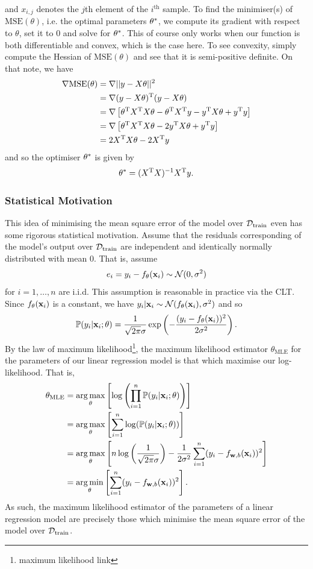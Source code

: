 \documentclass[11pt]{article}
\begin{document}
and $x_{i,j}$ denotes the $j$th element of the $i^{\text{th}}$ sample. To find the minimiser(s) of $\text{MSE}(\theta)$, i.e. the optimal parameters $\theta^{*}$, we compute its gradient with respect to $\theta$, set it to $0$ and solve for $\theta^{*}$. This of course only works when our function is both differentiable and convex, which is the case here. To see convexity, simply compute the Hessian of $\text{MSE}(\theta)$ and see that it is semi-positive definite. On that note, we have
\begin{align*}
    \nabla\text{MSE}(\theta)
    &=
    \nabla||y-X\theta||^2\\
    &=
    \nabla(y-X\theta)^{\text{T}}(y-X\theta)\\
    &=
    \nabla\left[\theta^{\text{T}}X^{\text{T}}X\theta-\theta^{\text{T}}X^{\text{T}}y-y^{\text{T}}X\theta+y^{\text{T}}y\right]\\
    &=
    \nabla\left[\theta^{\text{T}}X^{\text{T}}X\theta-2y^{\text{T}}X\theta+y^{\text{T}}y\right]\\
    &=
    2X^{\text{T}}X\theta-2X^{\text{T}}y
\end{align*}
and so the optimiser $\theta^{*}$ is given by
$$
\theta^{*}=(X^{\text{T}}X)^{-1}X^{\text{T}}y.
$$

\subsubsection{Statistical Motivation}

This idea of minimising the mean square error of the model over $\mathcal{D}_{\text{train}}$ even has some rigorous statistical motivation. Assume that the residuals corresponding of the model's output over $\mathcal{D}_{\text{train}}$ are independent and identically normally distributed with mean 0. That is, assume
$$
e_i
=
y_i-f_{\theta}(\mathbf{x}_i)\sim\mathcal{N}(0, \sigma^2)
$$
for $i=1,\dots,n$ are i.i.d. This assumption is reasonable in practice via the CLT. Since $f_{\theta}(\mathbf{x}_i)$ is a constant, we have $y_i|\mathbf{x}_i\sim\mathcal{N}(f_{\theta}(\mathbf{x}_i), \sigma^2)$ and so
$$
\mathbb{P}(y_i|\mathbf{x}_i;\theta)=\frac{1}{\sqrt{2\pi}\sigma}\exp\left(-\frac{(y_i-f_{\theta}(\mathbf{x}_i))^2}{2\sigma^2}\right).
$$
By the law of maximum likelihood\footnote{maximum likelihood link}, the maximum likelihood estimator $\theta_{\text{MLE}}$ for the parameters of our linear regression model is that which maximise our log-likelihood. That is,
\begin{align*}
    \theta_{\text{MLE}}&=\operatorname*{arg\,max}_{\theta}\left[\log\left(\prod_{i=1}^n\mathbb{P}(y_i|\mathbf{x}_i;\theta)\right)\right]\\
    &=\operatorname*{arg\,max}_{\theta}\left[\sum_{i=1}^n\log(\mathbb{P}(y_i|\mathbf{x}_i;\theta))\right]\\
    &=\operatorname*{arg\,max}_{\theta}\left[n\log\left(\frac{1}{\sqrt{2\pi}\sigma}\right)-\frac{1}{2\sigma^2}\sum_{i=1}^n(y_i-f_{\mathbf{w},b}(\mathbf{x}_i))^2\right]\\
    &=\operatorname*{arg\,min}_{\theta}\left[\sum_{i=1}^n(y_i-f_{\mathbf{w},b}(\mathbf{x}_i))^2\right].
\end{align*}
As such, the maximum likelihood estimator of the parameters of a linear regression model are precisely those which minimise the mean square error of the model over $\mathcal{D}_{\text{train}}$.
\end{document}
